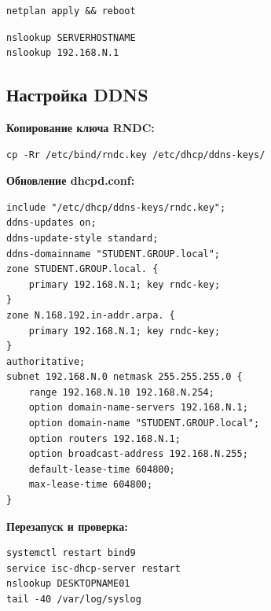 \begin{lstlisting}
netplan apply && reboot
\end{lstlisting}

\begin{lstlisting}
nslookup SERVERHOSTNAME
nslookup 192.168.N.1
\end{lstlisting}

\subsection{Настройка DDNS}

\textbf{Копирование ключа RNDC:}
\begin{lstlisting}
cp -Rr /etc/bind/rndc.key /etc/dhcp/ddns-keys/
\end{lstlisting}

\textbf{Обновление dhcpd.conf:}
\begin{lstlisting}
include "/etc/dhcp/ddns-keys/rndc.key";
ddns-updates on;
ddns-update-style standard;
ddns-domainname "STUDENT.GROUP.local";
zone STUDENT.GROUP.local. {
    primary 192.168.N.1; key rndc-key;
}
zone N.168.192.in-addr.arpa. {
    primary 192.168.N.1; key rndc-key;
}
authoritative;
subnet 192.168.N.0 netmask 255.255.255.0 {
    range 192.168.N.10 192.168.N.254;
    option domain-name-servers 192.168.N.1;
    option domain-name "STUDENT.GROUP.local";
    option routers 192.168.N.1;
    option broadcast-address 192.168.N.255;
    default-lease-time 604800;
    max-lease-time 604800;
}
\end{lstlisting}

\textbf{Перезапуск и проверка:}
\begin{lstlisting}
systemctl restart bind9
service isc-dhcp-server restart
nslookup DESKTOPNAME01
tail -40 /var/log/syslog
\end{lstlisting}
